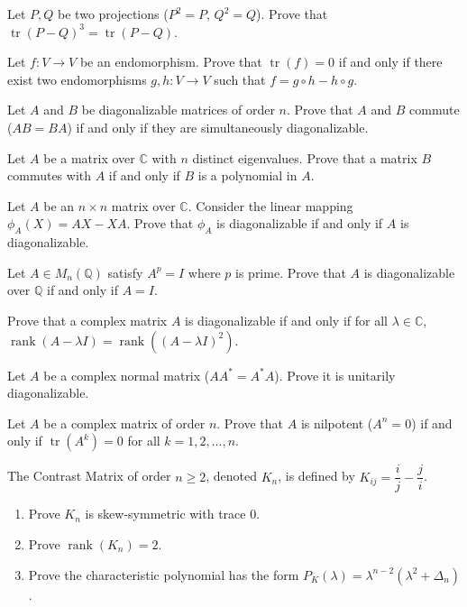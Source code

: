 \documentclass[12pt]{article}
\begin{document}
\begin{problems}
\item Let $P,Q$ be two projections ($P^2=P$, $Q^2=Q$). Prove that $\operatorname{tr}(P-Q)^3=\operatorname{tr}(P-Q)$.

\item Let $f:V\to V$ be an endomorphism. Prove that $\operatorname{tr}(f)=0$ if and only if there exist two endomorphisms $g,h:V\to V$ such that $f=g\circ h - h\circ g$.

\item Let $A$ and $B$ be diagonalizable matrices of order $n$. Prove that $A$ and $B$ commute ($AB=BA$) if and only if they are simultaneously diagonalizable.

\item Let $A$ be a matrix over $\mathbb{C}$ with $n$ distinct eigenvalues. Prove that a matrix $B$ commutes with $A$ if and only if $B$ is a polynomial in $A$.

\item Let $A$ be an $n\times n$ matrix over $\mathbb{C}$. Consider the linear mapping $\phi_A(X)=AX-XA$. Prove that $\phi_A$ is diagonalizable if and only if $A$ is diagonalizable.

\item Let $A\in M_n(\mathbb{Q})$ satisfy $A^p=I$ where $p$ is prime. Prove that $A$ is diagonalizable over $\mathbb{Q}$ if and only if $A=I$.

\item Prove that a complex matrix $A$ is diagonalizable if and only if for all $\lambda\in\mathbb{C}$, $\operatorname{rank}(A-\lambda I) = \operatorname{rank}((A-\lambda I)^2)$.

\item Let $A$ be a complex normal matrix ($AA^*=A^*A$). Prove it is unitarily diagonalizable.

\item Let $A$ be a complex matrix of order $n$. Prove that $A$ is nilpotent ($A^n=0$) if and only if $\operatorname{tr}(A^k)=0$ for all $k=1,2,\dots,n$.

\item The Contrast Matrix of order $n\ge 2$, denoted $K_n$, is defined by $K_{ij}=\dfrac{i}{j}-\dfrac{j}{i}$.
\begin{enumerate}[label=(\alph*)]
\item Prove $K_n$ is skew-symmetric with trace $0$.
\item Prove $\operatorname{rank}(K_n)=2$.
\item Prove the characteristic polynomial has the form $P_K(\lambda)=\lambda^{n-2}(\lambda^2+\Delta_n)$.
\end{enumerate}


\end{problems}
\end{document}
